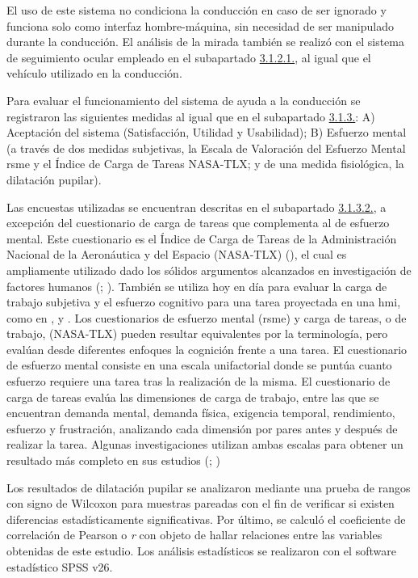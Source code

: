 El uso de este sistema no condiciona la conducción en caso de ser ignorado y funciona solo como interfaz hombre-máquina, sin necesidad de ser manipulado durante la conducción. El análisis de la mirada también se realizó con el sistema de seguimiento ocular empleado en el subapartado \hyperref[3121]{3.1.2.1.}, al igual que el vehículo utilizado en la conducción. 

Para evaluar el funcionamiento del sistema de ayuda a la conducción se registraron las siguientes medidas al igual que en el subapartado \hyperref[313]{3.1.3.}: A) Aceptación del sistema (Satisfacción, Utilidad y Usabilidad); B) Esfuerzo mental (a través de dos medidas subjetivas, la Escala de Valoración del Esfuerzo Mental \gls{rsme} y el Índice de Carga de Tareas NASA-TLX; y de una medida fisiológica, la dilatación pupilar). 

Las encuestas utilizadas se encuentran descritas en el subapartado \hyperref[3132]{3.1.3.2.}, a excepción del cuestionario de carga de tareas que complementa al de esfuerzo mental. Este cuestionario es el Índice de Carga de Tareas de la Administración Nacional de la Aeronáutica y del Espacio (NASA-TLX) (\cite{hart}), el cual es ampliamente utilizado dado los sólidos argumentos alcanzados en investigación de factores humanos (\cite{pauzie}; \cite{rubio}). También se utiliza hoy en día para evaluar la carga de trabajo subjetiva y el esfuerzo cognitivo para una tarea proyectada en una \gls{hmi}, como en \textcite{pereira}, \textcite{matthews} y \textcite{papis}. Los cuestionarios de esfuerzo mental (\gls{rsme}) y carga de tareas, o de trabajo, (NASA-TLX) pueden resultar equivalentes por la terminología, pero evalúan desde diferentes enfoques la cognición frente a una tarea. El cuestionario de esfuerzo mental consiste en una escala unifactorial donde se puntúa cuanto esfuerzo requiere una tarea tras la realización de la misma. El cuestionario de carga de tareas evalúa las dimensiones de carga de trabajo, entre las que se encuentran demanda mental, demanda física, exigencia temporal, rendimiento, esfuerzo y frustración, analizando cada dimensión por pares antes y después de realizar la tarea. Algunas investigaciones utilizan ambas escalas para obtener un resultado más completo en sus estudios (\cite{sartang}; \cite{longo})

Los resultados de dilatación pupilar se analizaron mediante una prueba de rangos con signo de Wilcoxon para muestras pareadas con el fin de verificar si existen diferencias estadísticamente significativas. Por último, se calculó el coeficiente de correlación de Pearson o \emph{r} con objeto de hallar relaciones entre las variables obtenidas de este estudio. Los análisis estadísticos se realizaron con el software estadístico SPSS v26.

